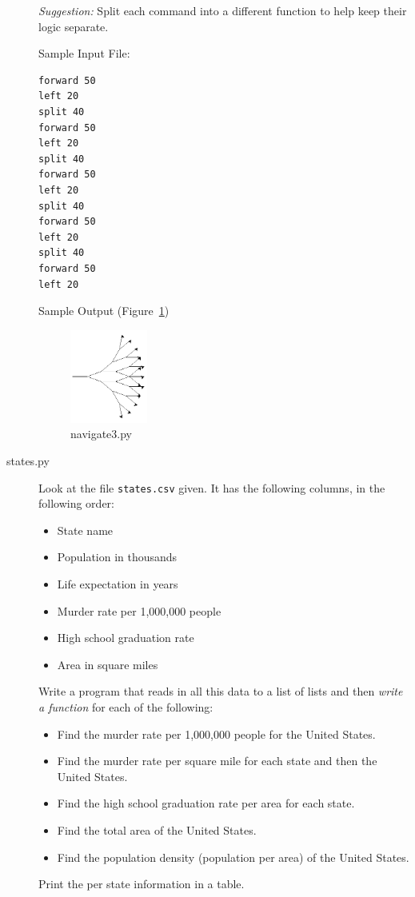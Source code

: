 \documentclass[11pt]{cselabheader}
\begin{document}
\begin{description}
  \emph{Suggestion:} Split each command into a different function to help keep their logic separate.

  Sample Input File:
  \begin{lstlisting}[style=python]
forward 50
left 20
split 40
forward 50
left 20
split 40
forward 50
left 20
split 40
forward 50
left 20
split 40
forward 50
left 20
  \end{lstlisting}

  Sample Output (Figure~\ref{fig:nav})
  \begin{figure}[!h]
    \centering
    \includegraphics[width=1.0in]{img/nav3_example}
    \caption{navigate3.py}
    \label{fig:nav}
  \end{figure}

  \pagebreak
  \item[states.py]
    Look at the file \texttt{states.csv} given. It has the following columns, in
    the following order:
    \begin{itemize}
      \item State name
      \item Population in thousands
      \item Life expectation in years
      \item Murder rate per 1,000,000 people
      \item High school graduation rate
      \item Area in square miles
    \end{itemize}

    Write a program that reads in all this data to a list of lists and then
    \emph{write a function} for each of the following:
    \begin{itemize}
      \item Find the murder rate per 1,000,000 people for the United States.
      \item Find the murder rate per square mile for each state and then the
        United States.
      \item Find the high school graduation rate per area for each state.
      \item Find the total area of the United States.
      \item Find the population density (population per area) of the United
        States.
    \end{itemize}

    Print the per state information in a table.
\end{description}
\end{document}
